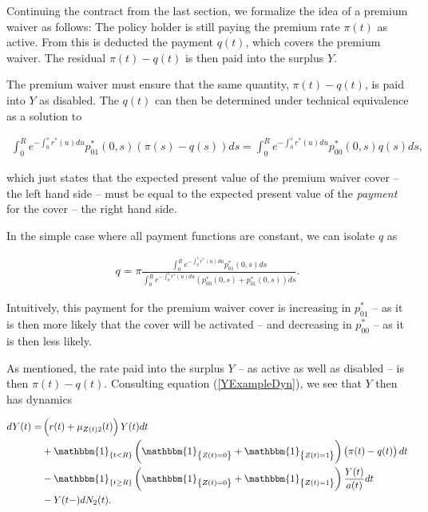 \documentclass{article}
\newcommand{\1}[1]{\mathbbm{1}_{\left\lbrace #1 \right\rbrace}}
\theoremstyle{break}
\theoremstyle{remark}
\newenvironment{remark}
  {\pushQED{\qed}\renewcommand{\qedsymbol}{\scalebox{1.4}{$\circ$}}\remarkx}
  {\popQED\endremarkx}
\numberwithin{equation}{section}
\begin{document}
Continuing the contract from the last section, we formalize the idea of a premium waiver as follows: The policy holder is still paying the premium rate $\pi(t)$ as active. From this is deducted the payment $q(t)$, which covers the premium waiver. The residual $\pi(t) - q(t)$ is then paid into the surplus $Y$.

The premium waiver must ensure that the same quantity, $\pi(t) - q(t)$, is paid into $Y$ as disabled. The $q(t)$ can then be determined under technical equivalence as a solution to 

\begin{align*}
	\int_0^R e^{-\int_0^s r^*(u)du}  p_{01}^*(0,s) \left( \pi(s) - q(s) \right) ds = \int_0^R e^{-\int_0^s r^*(u)du} p^*_{00}(0,s) q(s) ds,
\end{align*}

which just states that the expected present value of the premium waiver cover -- the left hand side -- must be equal to the expected present value of the \textit{payment} for the cover -- the right hand side.

\begin{remark}
	In the simple case where all payment functions are constant, we can isolate $q$ as

\begin{align*}
	q = \pi \frac{\int_0^R e^{-\int_0^s r^*(u)du} p_{01}^*(0,s) ds}{\int_0^R e^{-\int_0^s r^*(u)du} \left(p_{00}^*(0,s) + p_{01}^*(0,s)\right) ds}.
\end{align*}

Intuitively, this payment for the premium waiver cover is increasing in $p_{01}^*$ -- as it is then more likely that the cover will be activated -- and decreasing in $p_{00}^*$ -- as it is then less likely.
\end{remark}

As mentioned, the rate paid into the surplus $Y$ -- as active as well as disabled -- is then $\pi(t) - q(t)$. Consulting equation (\ref{YExampleDyn}), we see that $Y$ then has dynamics

\begin{align*}
\begin{split}
	dY(t) =& \left( r(t) + \mu_{Z(t)2}(t) \right) Y(t) dt \\
	&+ \1{t<R} \left( \1{Z(t)=0} + \1{Z(t)=1} \right) \left(\pi(t) - q(t) \right) dt \\
	&- \1{t \geq R} \left( \1{Z(t)=0} + \1{Z(t)=1} \right) \frac{Y(t)}{a(t)} dt \\
	&- Y(t-) dN_2(t).
\end{split}
\end{align*}
\end{document}
